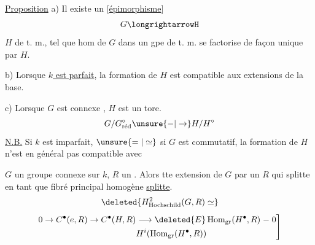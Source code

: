 \uline{Proposition} a)  Il existe un  [\uline{épimorphisme}]
\[
G\longrightarrowH
\]
$H$ de t. m., tel que  hom de $G$ dans un gpe de t. m. se factorise de façon unique par $H$.

b) Lorsque \uline{$k$ est parfait}, la formation de $H$ est compatible aux  extensions de la base.

c) Lorsque $G$ est connexe , $H$ est un tore.
\[
G/G^{\circ}_{\text{réd}}\unsure{\mathord{-}|\to}H/H^{\circ}
\]
\uline{N.B.} Si $k$ est imparfait, $\unsure{=|\simeq}$ si $G$ est commutatif,  la formation de $H$ n'est en général pas compatible avec

 $G$ un groupe connexe  sur $k$, $R$ un . Alors tte extension de $G$ par un $R$ qui splitte en tant que fibré principal homogène \uline{splitte}.
\[
\deleted{H^{2}_{\text{Hochschild}}(G,R)\simeq}
\]
\[
\left.\begin{aligned}
0\to C^{\bullet}(e,R)\to C^{\bullet}(H,R)&\longrightarrow
\deleted{E}\operatorname{Hom}_{\mathrm{gr}}(H^{\bullet},R)\mathrel{-}0\\
&H^i(\operatorname{Hom}_{\mathrm{gr}}(H^{\bullet},R))
\end{aligned}\right]
\]
